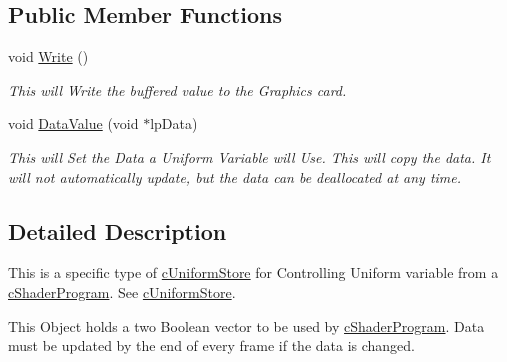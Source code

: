 \subsection*{Public Member Functions}
\begin{DoxyCompactItemize}
\item 
\hypertarget{classc_uniform_boolean_vector2_ac7c0a871c95d1f9bf53253de697799ff}{
void \hyperlink{classc_uniform_boolean_vector2_ac7c0a871c95d1f9bf53253de697799ff}{Write} ()}
\label{classc_uniform_boolean_vector2_ac7c0a871c95d1f9bf53253de697799ff}

\begin{DoxyCompactList}\small\item\em This will Write the buffered value to the Graphics card. \end{DoxyCompactList}\item 
\hypertarget{classc_uniform_boolean_vector2_a45f7683ae9ce8efb3fe529daff65a428}{
void \hyperlink{classc_uniform_boolean_vector2_a45f7683ae9ce8efb3fe529daff65a428}{DataValue} (void $\ast$lpData)}
\label{classc_uniform_boolean_vector2_a45f7683ae9ce8efb3fe529daff65a428}

\begin{DoxyCompactList}\small\item\em This will Set the Data a Uniform Variable will Use. This will copy the data. It will not automatically update, but the data can be deallocated at any time. \end{DoxyCompactList}\end{DoxyCompactItemize}


\subsection{Detailed Description}
This is a specific type of \hyperlink{classc_uniform_store}{cUniformStore} for Controlling Uniform variable from a \hyperlink{classc_shader_program}{cShaderProgram}. See \hyperlink{classc_uniform_store}{cUniformStore}. 

This Object holds a two Boolean vector to be used by \hyperlink{classc_shader_program}{cShaderProgram}. Data must be updated by the end of every frame if the data is changed. 
